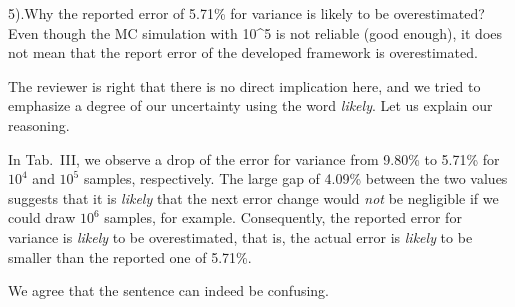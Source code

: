 \begin{reviewer}
5).Why the reported error of 5.71\% for variance is likely to be overestimated? Even though the MC simulation with 10\^{}5 is not reliable (good enough), it does not mean that the report error of the developed framework is overestimated.
\end{reviewer}
\begin{authors}
The reviewer is right that there is no direct implication here, and we tried to emphasize a degree of our uncertainty using the word \emph{likely}.
Let us explain our reasoning.

In Tab.~III, we observe a drop of the error for variance from 9.80\% to 5.71\% for $10^4$ and $10^5$ samples, respectively.
The large gap of 4.09\% between the two values suggests that it is \emph{likely} that the next error change would \emph{not} be negligible if we could draw $10^6$ samples, for example.
Consequently, the reported error for variance is \emph{likely} to be overestimated, that is, the actual error is \emph{likely} to be smaller than the reported one of 5.71\%.

We agree that the sentence can indeed be confusing.

\begin{actions}
\end{actions}
\end{authors}

